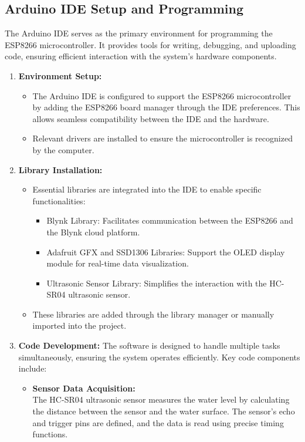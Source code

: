 {\subsection{Arduino IDE Setup and Programming}
The Arduino IDE serves as the primary environment for programming the ESP8266 microcontroller. It provides tools for writing, debugging, and uploading code, ensuring efficient interaction with the system's hardware components.
\begin{enumerate}
  \item \textbf{Environment Setup:}\\
    \begin{itemize}
      \item The Arduino IDE is configured to support the ESP8266 microcontroller by adding the ESP8266 board manager through the IDE preferences. This allows seamless compatibility between the IDE and the hardware.
      \item Relevant drivers are installed to ensure the microcontroller is recognized by the computer.
    \end{itemize}
  \item \textbf{Library Installation:}
    \begin{itemize}
      \item Essential libraries are integrated into the IDE to enable specific functionalities:
      \begin{itemize}
        \item Blynk Library: Facilitates communication between the ESP8266 and the Blynk cloud platform.
        \item Adafruit GFX and SSD1306 Libraries: Support the OLED display module for real-time data visualization.
        \item Ultrasonic Sensor Library: Simplifies the interaction with the HC-SR04 ultrasonic sensor.
      \end{itemize}
      \item These libraries are added through the library manager or manually imported into the project.
    \end{itemize}
  \item \textbf{Code Development:}
    The software is designed to handle multiple tasks simultaneously, ensuring the system operates efficiently. Key code components include:
    \begin{itemize}
      \item \textbf{Sensor Data Acquisition:}\\
        The HC-SR04 ultrasonic sensor measures the water level by calculating the distance between the sensor and the water surface. The sensor's echo and trigger pins are defined, and the data is read using precise timing functions.

\end{itemize}
\end{enumerate}}
